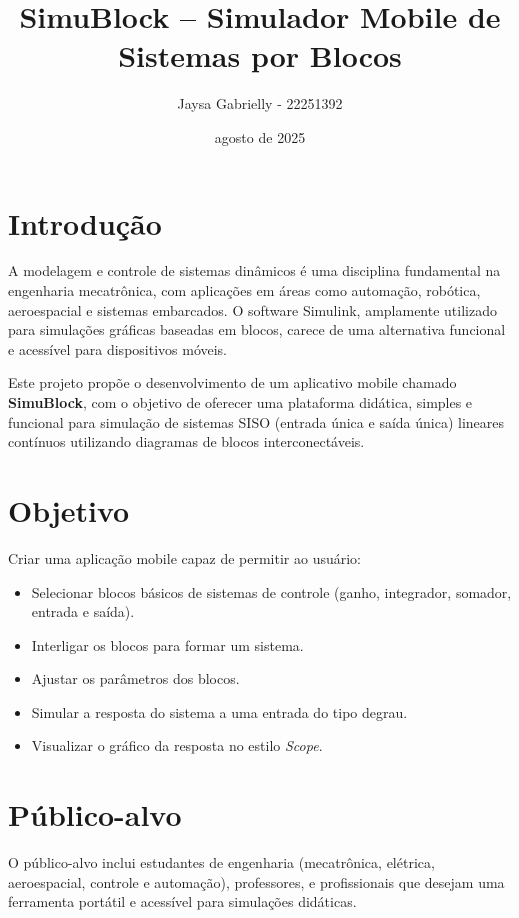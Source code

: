 \documentclass[12pt]{article}
\title{SimuBlock -- Simulador Mobile de Sistemas por Blocos}
\author{Jaysa Gabrielly - 22251392}
\date{agosto de 2025}
\begin{document}
\maketitle

\section*{Introdução}

A modelagem e controle de sistemas dinâmicos é uma disciplina fundamental na engenharia mecatrônica, com aplicações em áreas como automação, robótica, aeroespacial e sistemas embarcados. O software Simulink, amplamente utilizado para simulações gráficas baseadas em blocos, carece de uma alternativa funcional e acessível para dispositivos móveis.

Este projeto propõe o desenvolvimento de um aplicativo mobile chamado \textbf{SimuBlock}, com o objetivo de oferecer uma plataforma didática, simples e funcional para simulação de sistemas SISO (entrada única e saída única) lineares contínuos utilizando diagramas de blocos interconectáveis. 

\section*{Objetivo}

Criar uma aplicação mobile capaz de permitir ao usuário:
\begin{itemize}
    \item Selecionar blocos básicos de sistemas de controle (ganho, integrador, somador, entrada e saída).
    \item Interligar os blocos para formar um sistema.
    \item Ajustar os parâmetros dos blocos.
    \item Simular a resposta do sistema a uma entrada do tipo degrau.
    \item Visualizar o gráfico da resposta no estilo \textit{Scope}.
\end{itemize}

\section*{Público-alvo}

O público-alvo inclui estudantes de engenharia (mecatrônica, elétrica, aeroespacial, controle e automação), professores, e profissionais que desejam uma ferramenta portátil e acessível para simulações didáticas.
\end{document}
